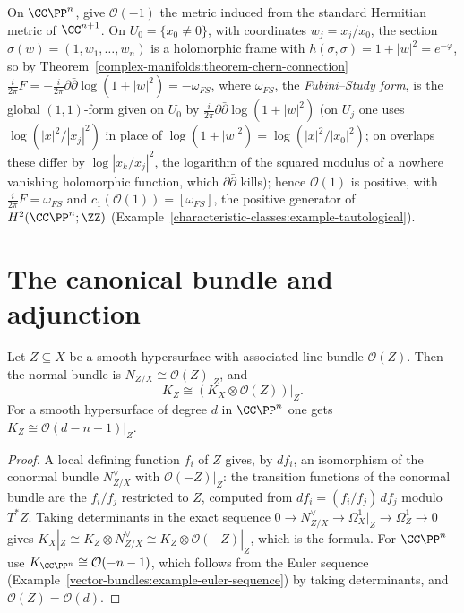 \begin{example}\label{complex-manifolds:example-fubini-study}
On $\CC\PP^n$, give $\mathcal{O}(-1)$ the metric induced from the standard Hermitian metric of $\CC^{n+1}$. On $U_0 = \{x_0 \neq 0\}$, with coordinates $w_j = x_j/x_0$, the section
$\sigma(w) = (1, w_1, \ldots, w_n)$ is a holomorphic frame with $h(\sigma, \sigma) = 1 + |w|^2 = e^{-\varphi}$, so by Theorem~\ref{complex-manifolds:theorem-chern-connection}
$\frac{i}{2\pi}F = -\frac{i}{2\pi}\partial\bar\partial\log(1 + |w|^2) = -\omega_{FS}$, where $\omega_{FS}$, the \emph{Fubini--Study form}, is the global $(1,1)$-form given on $U_0$ by
$\frac{i}{2\pi}\partial\bar\partial\log(1 + |w|^2)$ (on $U_j$ one uses $\log(|x|^2/|x_j|^2)$ in place of $\log(1 + |w|^2) = \log(|x|^2/|x_0|^2)$; on overlaps these differ by $\log|x_k/x_j|^2$, the logarithm of the squared modulus of a nowhere
vanishing holomorphic function, which $\partial\bar\partial$ kills); hence
$\mathcal{O}(1)$ is positive, with $\frac{i}{2\pi}F = \omega_{FS}$ and $c_1(\mathcal{O}(1)) = [\omega_{FS}]$, the positive generator of $H^2(\CC\PP^n; \ZZ)$
(Example~\ref{characteristic-classes:example-tautological}).
\end{example}

\section{The canonical bundle and adjunction}\label{complex-manifolds:section-adjunction}

\begin{proposition}[Adjunction]\label{complex-manifolds:proposition-adjunction}
Let $Z \subseteq X$ be a smooth hypersurface with associated line bundle $\mathcal{O}(Z)$. Then the normal bundle is $N_{Z/X} \cong \mathcal{O}(Z)|_Z$, and
\[
K_Z \cong \left(K_X \otimes \mathcal{O}(Z)\right)\big|_Z .
\]
For a smooth hypersurface of degree $d$ in $\CC\PP^n$ one gets $K_Z \cong \mathcal{O}(d - n - 1)|_Z$.
\end{proposition}

\begin{proof}
A local defining function $f_i$ of $Z$ gives, by $df_i$, an isomorphism of the conormal bundle $N^\vee_{Z/X}$ with $\mathcal{O}(-Z)|_Z$: the transition functions of the conormal bundle are the
$f_i/f_j$ restricted to $Z$, computed from $df_i = (f_i/f_j)\,df_j$ modulo $T^*Z$. Taking determinants in the exact sequence
$0 \to N^\vee_{Z/X} \to \Omega^1_X|_Z \to \Omega^1_Z \to 0$ gives $K_X|_Z \cong K_Z \otimes N^\vee_{Z/X} \cong K_Z \otimes \mathcal{O}(-Z)|_Z$, which is the formula. For $\CC\PP^n$ use
$K_{\CC\PP^n} \cong \mathcal{O}(-n-1)$, which follows from the Euler sequence (Example~\ref{vector-bundles:example-euler-sequence}) by taking determinants, and $\mathcal{O}(Z) = \mathcal{O}(d)$.
\end{proof}

